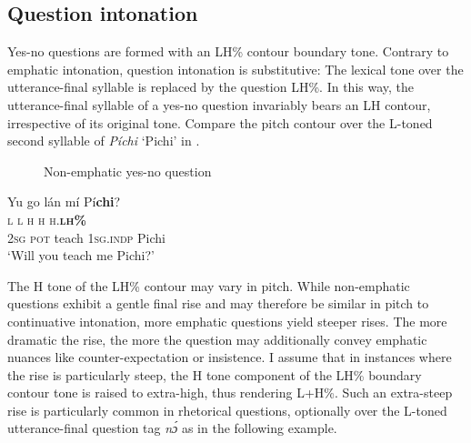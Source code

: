 \subsection{Question intonation}\label{sec:3.4.5}

Yes-no questions are formed with an LH\% contour boundary tone. Contrary to emphatic intonation, question intonation is substitutive: The lexical tone over the utterance-final syllable is replaced by the question LH\%. In this way, the utterance-final syllable of a yes-no question invariably bears an LH contour, irrespective of its original tone. Compare the pitch contour over the L-toned second syllable of \textit{Píchi} ‘Pichi’ in .

\begin{figure}
\caption{Non-emphatic yes-no question}
\label{fig:key:3.43}
\end{figure}

\ea%
    \label{ex:key:96}
    \glll   Yu    go    lán    mí    Pí\textbf{chi}?\\
\textsc{l}    \textsc{l}    \textsc{h}    \textsc{h}    \textsc{h.}\textbf{\textsc{lh\%}}\\
\textsc{2sg}    \textsc{pot}    teach  \textsc{1sg.indp}  Pichi\\
\glt ‘Will you teach me Pichi?’  
\z

The H tone of the LH\% contour may vary in pitch. While non-emphatic questions exhibit a gentle final rise and may therefore be similar in pitch to continuative intonation, more emphatic questions yield steeper rises. The more dramatic the rise, the more the question may additionally convey emphatic nuances like counter-expectation or insistence. I assume that in instances where the rise is particularly steep, the H tone component of the LH\% boundary contour tone is raised to extra-high, thus rendering L+H\%. Such an extra-steep rise is particularly common in rhetorical questions, optionally over the L-toned utterance-final question tag \textit{nɔ́} as in the following example.

